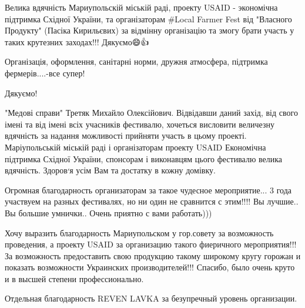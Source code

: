  
 
 
 
 

\qqSecCmt


Велика вдячність Мариупольскій міській раді, проекту USAID - экономічна
підтримка Східної України, та організаторам \#Local Farmer Fest від "Власного
Продукту" (Пасіка Кирильєвих) за відмінну організацію та змогу брати участь у
таких крутезних заходах!!! Дякуємо😄👍💯🔥


Організація, оформлення, санітарні норми, дружня атмосфера, підтримка фермерів....-все супер!

Дякуємо!


"Медові справи" Третяк Михайло Олексійович. Відвідавши даний захід, від свого
імені та від імені всіх учасників фестивалю, хочеться висловити величезну
вдячність за надання можливості прийняти участь в цьому проекті. Маріупольській
міській раді і організаторам проекту USAID Економічна підтримка Східної
України, спонсорам і виконавцям цього фестивалю велика вдячність. Здоров׳я усім
Вам та достатку в кожну домівку.


Огромная благодарность организаторам за такое чудесное мероприятие... 3 года
участвуем на разных фестивалях, но ни один не сравнится с этим!!!! Вы лучшие.. Вы
большие умнички.. Очень приятно с вами работать)))


Хочу выразить благодарность Мариупольском у гор.совету за возможность
проведения, а проекту USAID за организацию такого фиеричного мероприятия!!! За
возможность предоставить свою продукцию такому широкому кругу горожан и
показать возможности Украинских производителей!!! Спасибо, было очень круто и в
высшей степени профессионально.

Отдельная благодарность REVEN LAVKA за безупречный уровень организации.


